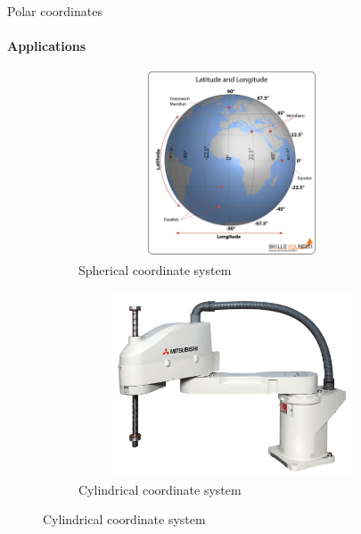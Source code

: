\documentclass[aspectratio=169]{beamer}
\begin{document}
\begin{frame}[t]{Polar coordinates}
\framesubtitle{Applications}
\vspace{-0.6cm}
\begin{figure}[H]
    \begin{subfigure}{0.49\textwidth}
        \centering\includegraphics[height=5.5cm,width=1\textwidth,keepaspectratio]{latitude-longitude.png}
        \caption*{Spherical coordinate system}
        \label{fig:latitude-longitude.png}
    \end{subfigure}
    \begin{subfigure}{0.49\textwidth}
        \centering\includegraphics[height=5.5cm,width=1\textwidth,keepaspectratio]{SCARA-robot.jpg}
        \caption*{Cylindrical coordinate system}
        \label{fig:SCARA-robot.jpg}
    \end{subfigure}

\end{figure}  
\end{frame}
\end{document}
